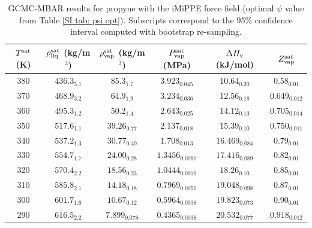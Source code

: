 \documentclass[journal=jctc,manuscript=article]{achemso}
\begin{document}
\begin{table}[htb!]
	\caption{GCMC-MBAR results for propyne with the iMiPPE force field (optimal $\psi$ value from Table \ref{SI tab: psi opt}). Subscripts correspond to the 95\% confidence interval computed with bootstrap re-sampling.}
	\begin{center}
		\begin{tabular}{|c|c|c|c|c|c|}
			\hline
			$T^{\rm sat}$ (K) & $\rho_{\rm liq}^{\rm sat}$ (kg/m$^3$) & $\rho_{\rm vap}^{\rm sat}$ (kg/m$^3$) & $P_{\rm vap}^{\rm sat}$ (MPa) & $\Delta H_{\rm v}$ (kJ/mol) & $Z_{\rm vap}^{\rm sat}$ \\ \hline
			380 & $436.3_{5.1}$ & $85.3_{1.7}$ & $3.923_{0.045}$ & $10.64_{0.20}$ & $0.58_{0.01}$ \\
			370 & $468.9_{3.2}$ & $64.9_{1.9}$ & $3.234_{0.036}$ & $12.56_{0.18}$ & $0.649_{0.012}$ \\
			360 & $495.3_{1.2}$ & $50.2_{1.4}$ & $2.643_{0.025}$ & $14.12_{0.13}$ & $0.705_{0.014}$ \\
			350 & $517.6_{1.1}$ & $39.26_{0.77}$ & $2.137_{0.018}$ & $15.39_{0.10}$ & $0.750_{0.011}$ \\
			340 & $537.2_{1.3}$ & $30.77_{0.40}$ & $1.708_{0.013}$ & $16.469_{0.084}$ & $0.79_{0.01}$ \\
			330 & $554.7_{1.7}$ & $24.00_{0.28}$ & $1.3456_{0.0097}$ & $17.416_{0.089}$ & $0.82_{0.01}$ \\
			320 & $570.4_{2.2}$ & $18.56_{0.23}$ & $1.0444_{0.0070}$ & $18.26_{0.10}$ & $0.85_{0.01}$ \\
			310 & $585.8_{2.1}$ & $14.18_{0.18}$ & $0.7969_{0.0050}$ & $19.048_{0.098}$ & $0.87_{0.01}$ \\
			300 & $601.7_{1.6}$ & $10.67_{0.12}$ & $0.5964_{0.0038}$ & $19.823_{0.073}$ & $0.90_{0.01}$ \\
			290 & $616.5_{2.2}$ & $7.899_{0.078}$ & $0.4365_{0.0038}$ & $20.532_{0.077}$ & $0.918_{0.012}$ \\
			\hline
		\end{tabular}
	\end{center}
\end{table}
\end{document}
